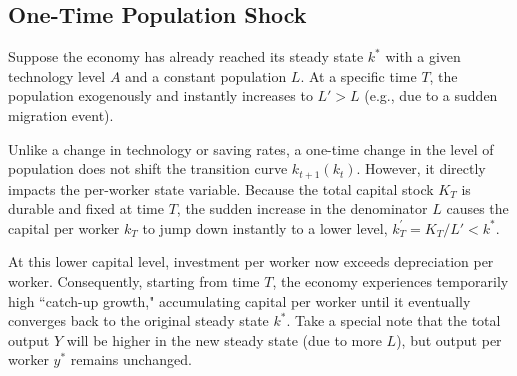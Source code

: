 \begin{center}
\end{center}

\subsection{One-Time Population Shock}

Suppose the economy has already reached its steady state $k^*$ with a given technology level $A$ and a constant population $L$. At a specific time $T$, the population exogenously and instantly increases to $L' > L$ (e.g., due to a sudden migration event).

Unlike a change in technology or saving rates, a one-time change in the level of population does not shift the transition curve $k_{t+1}(k_t)$. However, it directly impacts the per-worker state variable. Because the total capital stock $K_T$ is durable and fixed at time $T$, the sudden increase in the denominator $L$ causes the capital per worker $k_T$ to jump down instantly to a lower level, $k_T^{\prime} = K_T / L' < k^*$.

At this lower capital level, investment per worker now exceeds depreciation per worker. Consequently, starting from time $T$, the economy experiences temporarily high ``catch-up growth," accumulating capital per worker until it eventually converges back to the original steady state $k^*$. Take a special note that the total output $Y$ will be higher in the new steady state (due to more $L$), but output per worker $y^*$ remains unchanged.

